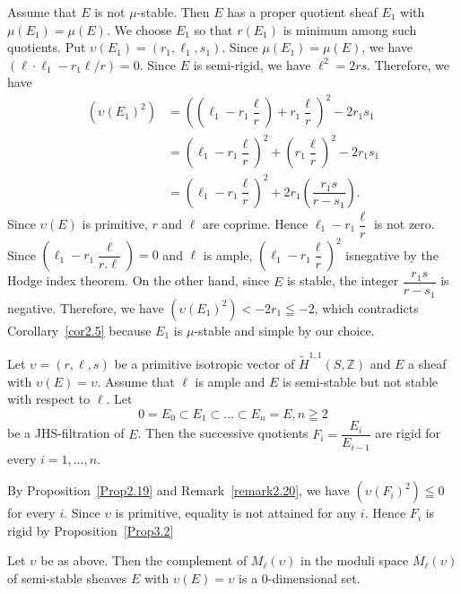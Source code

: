 \begin{Proof}
Assume that $E$ is not $\mu$-stable. Then $E$ has a proper quotient
sheaf $E_1$ with $\mu(E_1)=\mu(E)$. We choose $E_1$ so that $r(E_1)$
is minimum among such quotients. Put
$\upsilon(E_1)=(r_1,\ell_1,s_1)$. Since $\mu(E_1)=\mu(E)$, we have
$(\ell\cdot \ell_1-r_1\ell/r)=0$. Since $E$ is semi-rigid, we have
$\ell^{2}=2rs$. Therefore, we have 
$$
\begin{aligned}
\left(\upsilon(E_1)^{2}\right)&=\left(\left(\ell_1-r_1\dfrac{\ell}{r}\right)+r_1\dfrac{\ell}{r}\right)^{2}-2r_1s_1\\
&{}=\left(\ell_1-r_1\dfrac{\ell}{r}\right)^{2}+\left(r_1\dfrac{\ell}{r}\right)^{2}-2r_1s_1\\
&{}=\left(\ell_1-r_1\dfrac{\ell}{r}\right)^{2}+2r_1\left(\dfrac{r_1s}{r-s_1}\right).
\end{aligned}
$$
Since $\upsilon(E)$ is primitive, $r$ and $\ell$ are coprime. Hence
$\ell_1-r_1\dfrac{\ell}{r}$ is not zero. Since
$\left(\ell_1-r_1\dfrac{\ell}{r.\ell}\right)=0$ and  $\ell$ is ample,
$\left(\ell_1-r_1\dfrac{\ell}{r}\right)^{2}$ is\pageoriginale negative by the Hodge
index theorem. On the other hand, since $E$ is stable, the integer
$\dfrac{r_1s}{r-s_1}$ is negative. Therefore, we have
$(\upsilon(E_1)^{2})<-2r_1\leqq -2$, which contradicts
Corollary~\ref{cor2.5} because $E_1$ is $\mu$-stable and simple by our
choice. 
\enprf
\end{Proof}

\begin{Prop}\label{Prop3.17}
Let $\upsilon=(r,\ell,s)$ be a primitive isotropic vector of
$\widetilde{H}^{1,1}(S,\mathbb{Z})$ and $E$ a sheaf with
$\upsilon(E)=\upsilon$. Assume that $\ell$ is ample and $E$ is
semi-stable but not stable with respect to $\ell$. Let 
$$
0=E_0\subset E_1\subset\ldots \subset E_n=E, n\geqq 2
$$
be a JHS-filtration of $E$. Then the successive quotients
$F_i=\dfrac{E_i}{E_{i-1}}$ are rigid for every $i=1,\ldots,n$. 
\end{Prop}

\begin{Proof}
By Proposition~\ref{Prop2.19} and Remark~\ref{remark2.20}, we have
$\left(\upsilon (F_i)^{2}\right)\leqq 0$ for every $i$. Since
$\upsilon$ is primitive, equality is not attained for any $i$. Hence
$F_i$ is rigid by Proposition~\ref{Prop3.2}
\enprf
\end{Proof}

\begin{cor}\label{cor3.18}
Let $\upsilon$ be as above. Then the complement of
$M_{\ell}(\upsilon)$ in the moduli space
$\overline{M}_{\ell}(\upsilon)$ of semi-stable sheaves $E$ with
$\upsilon(E)=\upsilon$ is a $0$-dimensional set. 
\end{cor}


